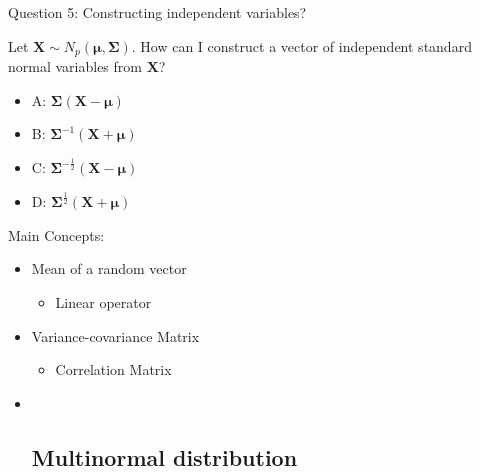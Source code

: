\documentclass[
  ignorenonframetext,
]{beamer}
\providecommand{\tightlist}{%
  \setlength{\itemsep}{0pt}\setlength{\parskip}{0pt}}
\begin{document}
\begin{frame}
\begin{block}{Question 5: Constructing independent variables?}
\protect\hypertarget{question-5-constructing-independent-variables}{}
\vspace{2mm}

Let \(\boldsymbol{X}\sim N_p(\boldsymbol{\mu},\boldsymbol\Sigma)\). How
can I construct a vector of independent standard normal variables from
\(\boldsymbol{X}\)?

\vspace{2mm}

\begin{itemize}
\tightlist
\item
  A: \(\boldsymbol\Sigma(\boldsymbol{X}-\boldsymbol{\mu})\)
\item
  B: \(\boldsymbol\Sigma^{-1}(\boldsymbol{X}+\boldsymbol{\mu})\)
\item
  C:
  \(\boldsymbol\Sigma^{-\frac{1}{2}}(\boldsymbol{X}-\boldsymbol{\mu})\)
\item
  D:
  \(\boldsymbol\Sigma^{\frac{1}{2}}(\boldsymbol{X}+\boldsymbol{\mu})\)
\end{itemize}
\end{block}
\end{frame}

\begin{frame}
\end{frame}

\begin{frame}
\begin{block}{Main Concepts:}
\protect\hypertarget{main-concepts}{}
\begin{itemize}
\item
  Mean of a random vector

  \begin{itemize}
  \tightlist
  \item
    Linear operator
  \end{itemize}
\item
  Variance-covariance Matrix

  \begin{itemize}
  \tightlist
  \item
    Correlation Matrix
  \end{itemize}
\item ~
  \hypertarget{multinormal-distribution}{%
  \subsection{Multinormal distribution}\label{multinormal-distribution}}
\end{itemize}
\end{block}
\end{frame}
\end{document}
